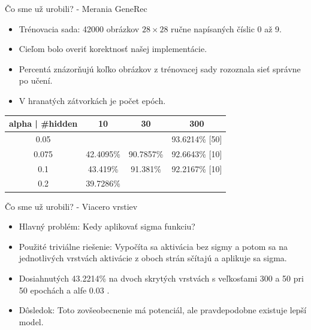 \documentclass[xcolor=dvipsnames]{beamer}
\begin{document}
\begin{frame}{Čo sme už urobili? - Merania GeneRec}
  \begin{itemize}
    \item Trénovacia sada: 42000 obrázkov $28 \times 28$ ručne napísaných číslic 0 až 9.  
    \item Cieľom bolo overiť korektnosť našej implementácie. 
    \item Percentá znázorňujú koľko obrázkov z trénovacej sady rozoznala sieť správne po učení. 
    \item V hranatých zátvorkách je počet epóch. 
  \end{itemize} 

  \begin{tabular}{|c|c|c|c|}
    \hline
    alpha | \#hidden & 10 & 30 & 300 \\
    \hline
    0.05 & & & 93.6214\% [50] \\
    \hline
    0.075 & 42.4095\% & 90.7857\% & 92.6643\% [10] \\
    \hline
    0.1 & 43.419\% & 91.381\% & 92.2167\% [10] \\
    \hline
    0.2 & 39.7286\% & & \\
    \hline
  \end{tabular}
\end{frame}


\begin{frame}{Čo sme už urobili? - Viacero vrstiev}
\begin{itemize}
  \item Hlavný problém: Kedy aplikovať sigma funkciu?
  \item Použité triviálne riešenie: Vypočíta sa aktivácia bez sigmy a potom sa na jednotlivých vrstvách aktivácie z oboch strán sčítajú a aplikuje sa sigma. 
  \item Dosiahnutých 43.2214\% na dvoch skrytých vrstvách s veľkosťami 300 a 50 pri 50 epochách a alfe 0.03 . 
  \item Dôsledok: Toto zovšeobecnenie má potenciál, ale pravdepodobne existuje lepší model. 
\end{itemize} 

\end{frame}
\end{document}
